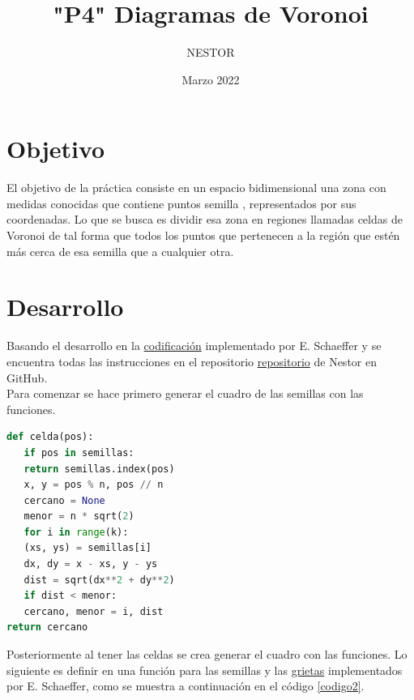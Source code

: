 \documentclass{article}
\title{"P4" Diagramas de Voronoi}
\author{NESTOR}
\date {Marzo 2022}
\begin{document}
\maketitle

\section{Objetivo}\label{obj}
El objetivo de la práctica consiste en un espacio bidimensional una zona con medidas conocidas que contiene  puntos semilla , representados por sus coordenadas. Lo que se busca es dividir esa zona en regiones llamadas celdas de Voronoi de tal forma que todos los puntos que pertenecen a la región que estén más cerca de esa semilla que a cualquier otra.

\section{Desarrollo}\label{des}
Basando el desarrollo en la \href{https://github.com/satuelisa/Simulation/blob/master/VoronoiDiagrams/fracture.py}{codificación} implementado por E. Schaeffer \cite{elisa1} y se encuentra todas las instrucciones en el repositorio \href{https://github.com/NestorZeus/SIMULACION-COMPUTACIONAL-DE-NANOMATERIALES/tree/main/P4}{repositorio} de Nestor en GitHub.\\

Para comenzar se hace primero generar el cuadro de las semillas con las funciones.

\begin{lstlisting}[caption=Función con las semillas, language=Python]
def celda(pos):
   if pos in semillas:
   return semillas.index(pos)
   x, y = pos % n, pos // n
   cercano = None
   menor = n * sqrt(2)
   for i in range(k):
   (xs, ys) = semillas[i]
   dx, dy = x - xs, y - ys
   dist = sqrt(dx**2 + dy**2)
   if dist < menor:
   cercano, menor = i, dist
return cercano
\end{lstlisting}

Posteriormente al tener las celdas se crea generar el cuadro con las funciones. Lo siguiente es definir en una función para las semillas y las \href{https://satuelisa.github.io/simulation/p3.html}{grietas} implementados por E. Schaeffer, como se muestra a continuación en el código \ref{codigo2}.
\end{document}
